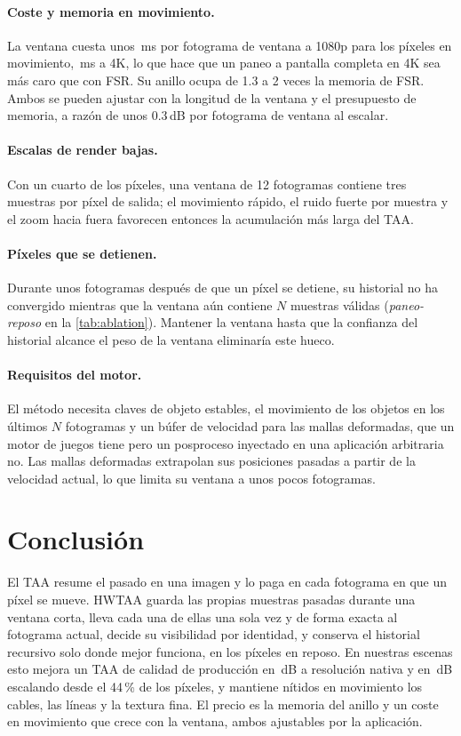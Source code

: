 \documentclass[11pt,a4paper]{article}
\begin{document}
\paragraph{Coste y memoria en movimiento.} La ventana cuesta unos \nMsPerFrameHd{}\,ms por fotograma de ventana a 1080p para los píxeles en movimiento, \nMsPerFrameUhd{}\,ms a 4K, lo que hace que un paneo a pantalla completa en 4K sea más caro que con FSR. Su anillo ocupa de 1.3 a 2 veces la memoria de FSR. Ambos se pueden ajustar con la longitud de la ventana y el presupuesto de memoria, a razón de unos 0.3\,dB por fotograma de ventana al escalar.

\paragraph{Escalas de render bajas.} Con un cuarto de los píxeles, una ventana de 12 fotogramas contiene tres muestras por píxel de salida; el movimiento rápido, el ruido fuerte por muestra y el zoom hacia fuera favorecen entonces la acumulación más larga del TAA.

\paragraph{Píxeles que se detienen.} Durante unos fotogramas después de que un píxel se detiene, su historial no ha convergido mientras que la ventana aún contiene $N$ muestras válidas (\emph{paneo-reposo} en la \cref{tab:ablation}). Mantener la ventana hasta que la confianza del historial alcance el peso de la ventana eliminaría este hueco.

\paragraph{Requisitos del motor.} El método necesita claves de objeto estables, el movimiento de los objetos en los últimos $N$ fotogramas y un búfer de velocidad para las mallas deformadas, que un motor de juegos tiene pero un posproceso inyectado en una aplicación arbitraria no. Las mallas deformadas extrapolan sus posiciones pasadas a partir de la velocidad actual, lo que limita su ventana a unos pocos fotogramas.

\section{Conclusión}

El TAA resume el pasado en una imagen y lo paga en cada fotograma en que un píxel se mueve. HWTAA guarda las propias muestras pasadas durante una ventana corta, lleva cada una de ellas una sola vez y de forma exacta al fotograma actual, decide su visibilidad por identidad, y conserva el historial recursivo solo donde mejor funciona, en los píxeles en reposo. En nuestras escenas esto mejora un TAA de calidad de producción en \nGainAllNat{}\,dB a resolución nativa y en \nGainAllQ{}\,dB escalando desde el 44\,\% de los píxeles, y mantiene nítidos en movimiento los cables, las líneas y la textura fina. El precio es la memoria del anillo y un coste en movimiento que crece con la ventana, ambos ajustables por la aplicación.
\end{document}
